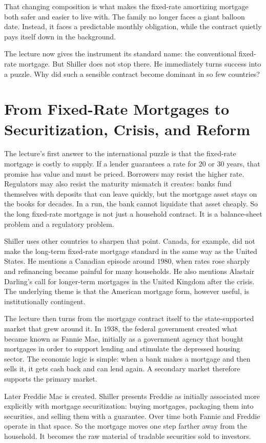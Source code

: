 That changing composition is what makes the fixed-rate amortizing mortgage both safer and easier to live with. The family no longer faces a giant balloon date. Instead, it faces a predictable monthly obligation, while the contract quietly pays itself down in the background.

The lecture now gives the instrument its standard name: the conventional fixed-rate mortgage. But Shiller does not stop there. He immediately turns success into a puzzle. Why did such a sensible contract become dominant in so few countries?

\section{From Fixed-Rate Mortgages to Securitization, Crisis, and Reform}

The lecture's first answer to the international puzzle is that the fixed-rate mortgage is costly to supply. If a lender guarantees a rate for \(20\) or \(30\) years, that promise has value and must be priced. Borrowers may resist the higher rate. Regulators may also resist the maturity mismatch it creates: banks fund themselves with deposits that can leave quickly, but the mortgage asset stays on the books for decades. In a run, the bank cannot liquidate that asset cheaply. So the long fixed-rate mortgage is not just a household contract. It is a balance-sheet problem and a regulatory problem.

Shiller uses other countries to sharpen that point. Canada, for example, did not make the long-term fixed-rate mortgage standard in the same way as the United States. He mentions a Canadian episode around \(1980\), when rates rose sharply and refinancing became painful for many households. He also mentions Alastair Darling's call for longer-term mortgages in the United Kingdom after the crisis. The underlying theme is that the American mortgage form, however useful, is institutionally contingent.

The lecture then turns from the mortgage contract itself to the state-supported market that grew around it. In \(1938\), the federal government created what became known as Fannie Mae, initially as a government agency that bought mortgages in order to support lending and stimulate the depressed housing sector. The economic logic is simple: when a bank makes a mortgage and then sells it, it gets cash back and can lend again. A secondary market therefore supports the primary market.

Later Freddie Mac is created. Shiller presents Freddie as initially associated more explicitly with mortgage securitization: buying mortgages, packaging them into securities, and selling them with a guarantee. Over time both Fannie and Freddie operate in that space. So the mortgage moves one step farther away from the household. It becomes the raw material of tradable securities sold to investors.

